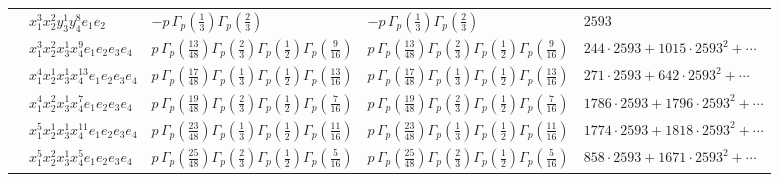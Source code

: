 \documentclass[11pt]{article}
\begin{document}
\begin{table}[ht]
{\begin{tabular}{@{}lllll@{}}
 & $x_{1}^{3} x_{2}^{2} y_{3}^{1} y_{4}^{8} e_{1} e_{2}$ & $- p \, \Gamma_p \left( \frac{1}{3} \right) \Gamma_p \left( \frac{2}{3} \right)$ & $- p \, \Gamma_p \left( \frac{1}{3} \right) \Gamma_p \left( \frac{2}{3} \right)$ & $2593$ \\
 & $x_{1}^{3} x_{2}^{2} x_{3}^{1} x_{4}^{9}  e_{1} e_{2} e_{3} e_{4}$ & $p \, \Gamma_p \left( \frac{13}{48} \right) \Gamma_p \left( \frac{2}{3} \right) \Gamma_p \left( \frac{1}{2} \right) \Gamma_p \left( \frac{9}{16} \right)$ & $p \, \Gamma_p \left( \frac{13}{48} \right) \Gamma_p \left( \frac{2}{3} \right) \Gamma_p \left( \frac{1}{2} \right) \Gamma_p \left( \frac{9}{16} \right)$ & $244{\cdot}2593{+}1015{\cdot}2593^{2}{+}\cdots$ \\
 & $x_{1}^{4} x_{2}^{1} x_{3}^{1} x_{4}^{13}  e_{1} e_{2} e_{3} e_{4}$ & $p \, \Gamma_p \left( \frac{17}{48} \right) \Gamma_p \left( \frac{1}{3} \right) \Gamma_p \left( \frac{1}{2} \right) \Gamma_p \left( \frac{13}{16} \right)$ & $p \, \Gamma_p \left( \frac{17}{48} \right) \Gamma_p \left( \frac{1}{3} \right) \Gamma_p \left( \frac{1}{2} \right) \Gamma_p \left( \frac{13}{16} \right)$ & $271{\cdot}2593{+}642{\cdot}2593^{2}{+}\cdots$ \\
 & $x_{1}^{4} x_{2}^{2} x_{3}^{1} x_{4}^{7}  e_{1} e_{2} e_{3} e_{4}$ & $p \, \Gamma_p \left( \frac{19}{48} \right) \Gamma_p \left( \frac{2}{3} \right) \Gamma_p \left( \frac{1}{2} \right) \Gamma_p \left( \frac{7}{16} \right)$ & $p \, \Gamma_p \left( \frac{19}{48} \right) \Gamma_p \left( \frac{2}{3} \right) \Gamma_p \left( \frac{1}{2} \right) \Gamma_p \left( \frac{7}{16} \right)$ & $1786{\cdot}2593{+}1796{\cdot}2593^{2}{+}\cdots$ \\
 & $x_{1}^{5} x_{2}^{1} x_{3}^{1} x_{4}^{11}  e_{1} e_{2} e_{3} e_{4}$ & $p \, \Gamma_p \left( \frac{23}{48} \right) \Gamma_p \left( \frac{1}{3} \right) \Gamma_p \left( \frac{1}{2} \right) \Gamma_p \left( \frac{11}{16} \right)$ & $p \, \Gamma_p \left( \frac{23}{48} \right) \Gamma_p \left( \frac{1}{3} \right) \Gamma_p \left( \frac{1}{2} \right) \Gamma_p \left( \frac{11}{16} \right)$ & $1774{\cdot}2593{+}1818{\cdot}2593^{2}{+}\cdots$ \\
 & $x_{1}^{5} x_{2}^{2} x_{3}^{1} x_{4}^{5}  e_{1} e_{2} e_{3} e_{4}$ & $p \, \Gamma_p \left( \frac{25}{48} \right) \Gamma_p \left( \frac{2}{3} \right) \Gamma_p \left( \frac{1}{2} \right) \Gamma_p \left( \frac{5}{16} \right)$ & $p \, \Gamma_p \left( \frac{25}{48} \right) \Gamma_p \left( \frac{2}{3} \right) \Gamma_p \left( \frac{1}{2} \right) \Gamma_p \left( \frac{5}{16} \right)$ & $858{\cdot}2593{+}1671{\cdot}2593^{2}{+}\cdots$ \\

\end{tabular}}
\end{table}
\end{document}

